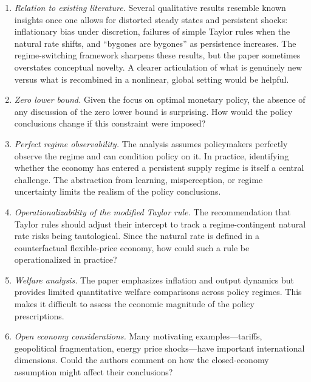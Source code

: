 \documentclass[12pt]{article}
\begin{document}
\begin{enumerate}

\item \textit{Relation to existing literature.}
Several qualitative results resemble known insights once one allows for distorted steady states and persistent shocks: inflationary bias under discretion, failures of simple Taylor rules when the natural rate shifts, and ``bygones are bygones'' as persistence increases. The regime-switching framework sharpens these results, but the paper sometimes overstates conceptual novelty. A clearer articulation of what is genuinely new versus what is recombined in a nonlinear, global setting would be helpful.

\item \textit{Zero lower bound.}
Given the focus on optimal monetary policy, the absence of any discussion of the zero lower bound is surprising. How would the policy conclusions change if this constraint were imposed?

\item \textit{Perfect regime observability.}
The analysis assumes policymakers perfectly observe the regime and can condition policy on it. In practice, identifying whether the economy has entered a persistent supply regime is itself a central challenge. The abstraction from learning, misperception, or regime uncertainty limits the realism of the policy conclusions.

\item \textit{Operationalizability of the modified Taylor rule.}
The recommendation that Taylor rules should adjust their intercept to track a regime-contingent natural rate risks being tautological. Since the natural rate is defined in a counterfactual flexible-price economy, how could such a rule be operationalized in practice?

\item \textit{Welfare analysis.}
The paper emphasizes inflation and output dynamics but provides limited quantitative welfare comparisons across policy regimes. This makes it difficult to assess the economic magnitude of the policy prescriptions.

\item \textit{Open economy considerations.}
Many motivating examples---tariffs, geopolitical fragmentation, energy price shocks---have important international dimensions. Could the authors comment on how the closed-economy assumption might affect their conclusions?

\end{enumerate}
\end{document}
